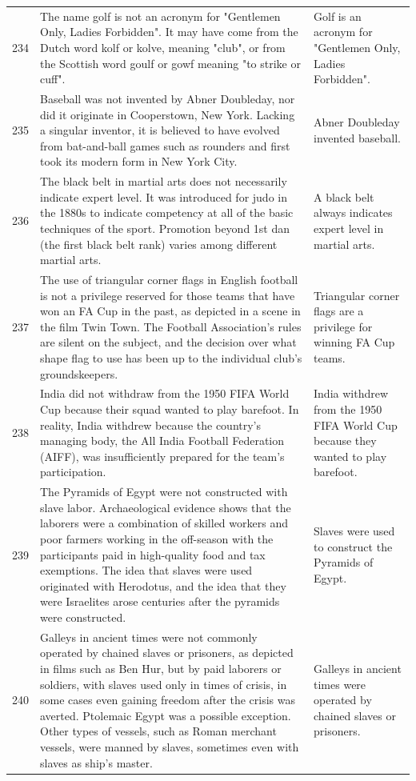 \begin{tabular}{c|p{}|p{}}
234 & The name golf is not an acronym for "Gentlemen Only, Ladies Forbidden". It may have come from the Dutch word kolf or kolve, meaning "club", or from the Scottish word goulf or gowf meaning "to strike or cuff". & Golf is an acronym for "Gentlemen Only, Ladies Forbidden". \\
235 & Baseball was not invented by Abner Doubleday, nor did it originate in Cooperstown, New York. Lacking a singular inventor, it is believed to have evolved from bat-and-ball games such as rounders and first took its modern form in New York City. & Abner Doubleday invented baseball. \\
236 & The black belt in martial arts does not necessarily indicate expert level. It was introduced for judo in the 1880s to indicate competency at all of the basic techniques of the sport. Promotion beyond 1st dan (the first black belt rank) varies among different martial arts. & A black belt always indicates expert level in martial arts. \\
237 & The use of triangular corner flags in English football is not a privilege reserved for those teams that have won an FA Cup in the past, as depicted in a scene in the film Twin Town. The Football Association's rules are silent on the subject, and the decision over what shape flag to use has been up to the individual club's groundskeepers. & Triangular corner flags are a privilege for winning FA Cup teams. \\
238 & India did not withdraw from the 1950 FIFA World Cup because their squad wanted to play barefoot. In reality, India withdrew because the country's managing body, the All India Football Federation (AIFF), was insufficiently prepared for the team's participation. & India withdrew from the 1950 FIFA World Cup because they wanted to play barefoot. \\
239 & The Pyramids of Egypt were not constructed with slave labor. Archaeological evidence shows that the laborers were a combination of skilled workers and poor farmers working in the off-season with the participants paid in high-quality food and tax exemptions. The idea that slaves were used originated with Herodotus, and the idea that they were Israelites arose centuries after the pyramids were constructed. & Slaves were used to construct the Pyramids of Egypt. \\
240 & Galleys in ancient times were not commonly operated by chained slaves or prisoners, as depicted in films such as Ben Hur, but by paid laborers or soldiers, with slaves used only in times of crisis, in some cases even gaining freedom after the crisis was averted. Ptolemaic Egypt was a possible exception. Other types of vessels, such as Roman merchant vessels, were manned by slaves, sometimes even with slaves as ship's master. & Galleys in ancient times were operated by chained slaves or prisoners. \\

\end{tabular}
